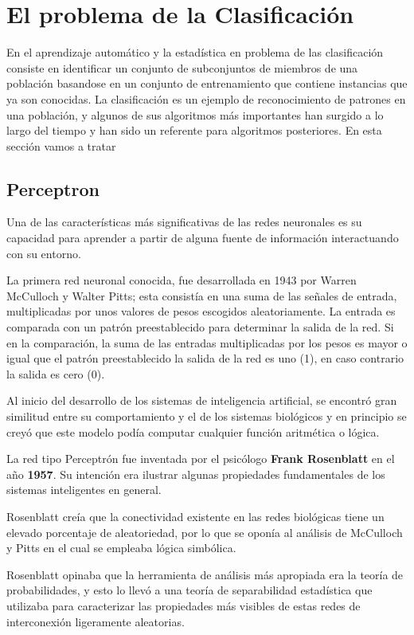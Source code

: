 \documentclass[a4paper, 11pt]{article} %
\begin{document}
\section{El problema de la Clasificación}
En el aprendizaje automático y la estadística en problema de las clasificación consiste en identificar un conjunto de subconjuntos de miembros de una población basandose en un conjunto de entrenamiento que contiene instancias que ya son conocidas. La clasificación es un ejemplo de reconocimiento de patrones en una población, y algunos de sus algoritmos más importantes han surgido a lo largo del tiempo y han sido un referente para algoritmos posteriores. En esta sección vamos a tratar

\subsection{Perceptron}
Una de las características más significativas de las redes neuronales es su capacidad para aprender a partir de alguna fuente de información interactuando con su entorno.

La primera red neuronal conocida, fue desarrollada en 1943 por Warren McCulloch y Walter Pitts; esta consistía en una suma de las señales de entrada, multiplicadas por unos valores de pesos escogidos aleatoriamente. La entrada es comparada con un patrón preestablecido para determinar la salida de la red. Si en la comparación, la suma de las entradas multiplicadas por los pesos es mayor o igual que el patrón preestablecido la salida de la red es uno (1), en caso contrario la salida es cero (0).

Al inicio del desarrollo de los sistemas de inteligencia artificial, se encontró gran similitud entre su comportamiento y el de los sistemas biológicos y en principio se creyó que este modelo podía computar cualquier función aritmética o lógica.

La red tipo Perceptrón fue inventada por el psicólogo \textbf{Frank Rosenblatt} en el año \textbf{1957}. Su intención era ilustrar algunas propiedades fundamentales de los sistemas inteligentes en general.

Rosenblatt creía que la conectividad existente en las redes biológicas tiene un elevado porcentaje de aleatoriedad, por lo que se oponía al análisis de McCulloch y Pitts en el cual se empleaba lógica simbólica.

Rosenblatt opinaba que la herramienta de análisis más apropiada era la teoría de probabilidades, y esto lo llevó a una teoría de separabilidad estadística que utilizaba para caracterizar las propiedades más visibles de estas redes de interconexión ligeramente aleatorias.
\end{document}
